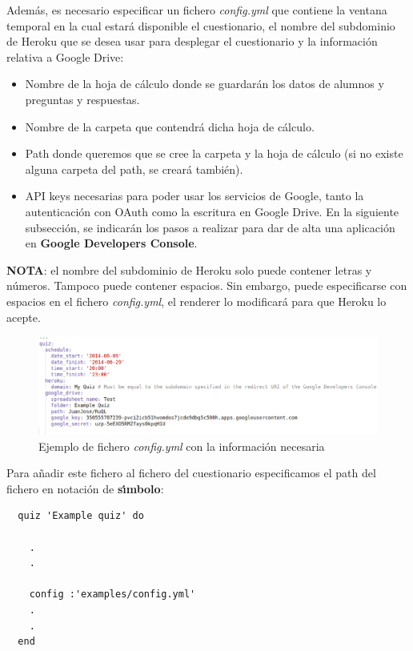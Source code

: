 Adem\'as, es necesario especificar un fichero \textit{config.yml} que contiene la ventana temporal en la cual estar\'a disponible
el cuestionario, el nombre del subdominio de Heroku que se desea usar para desplegar el cuestionario y la informaci\'on relativa a Google Drive:
\begin{itemize}
  \item Nombre de la hoja de c\'alculo donde se guardar\'an los datos de alumnos y preguntas y respuestas.
  \item Nombre de la carpeta que contendr\'a dicha hoja de c\'alculo.
  \item Path donde queremos que se cree la carpeta y la hoja de c\'alculo (si no existe alguna carpeta del path, se crear\'a tambi\'en).
  \item API keys necesarias para poder usar los servicios de Google, tanto la autenticaci\'on con OAuth como la escritura en Google Drive. 
  En la siguiente subsecci\'on,  se indicar\'an los pasos a realizar para dar de alta una aplicaci\'on en {\bfseries Google Developers Console}.
\end{itemize}

{\bfseries NOTA}: el nombre del subdominio de Heroku solo puede contener letras y n\'umeros. Tampoco puede contener espacios. Sin embargo, puede especificarse
con espacios en el fichero \textit{config.yml}, el renderer lo modificar\'a para que Heroku lo acepte.
\bigskip

\begin{figure}[!th]
\begin{center}
\includegraphics[width=1.2\textwidth]{images/config_yml.eps}
\caption{Ejemplo de fichero \textit{config.yml} con la informaci\'on necesaria}
\label{fig:config_yml}
\end{center}
\end{figure}
\newpage

Para a\~{n}adir este fichero al fichero del cuestionario especificamos el path del fichero en notaci\'on de {\bfseries s\'{\i}mbolo}:
\begin{verbatim}
  quiz 'Example quiz' do
    
    .
    .
    
    config :'examples/config.yml'
    .
    .
  end
\end{verbatim}
\newpage

